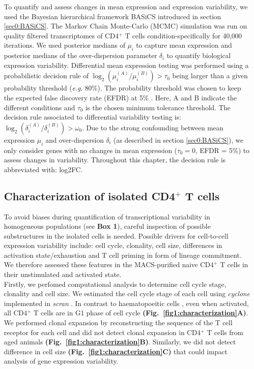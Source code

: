 To quantify and assess changes in mean expression and expression variability, we used the Bayesian hierarchical framework BASiCS introduced in section \ref{sec0:BASiCS}\citep{Vallejos2015BASiCS, Vallejos2016}. The Markov Chain Monte-Carlo (MCMC) simulation was run on quality filtered transcriptomes of CD4$^+$ T cells condition-specifically for 40,000 iterations. We used posterior medians of $\mu_i$ to capture mean expression and posterior medians of the over-dispersion parameter $\delta_i$ to quantify biological expression variability. Differential mean expression testing was performed using a probabilistic decision rule of $\log_2(\mu_i^{(A)}/\mu_i^{(B)})>\tau_0$ being larger than a given probability threshold (\emph{e.g.} 80\%). The probability threshold was chosen to keep the expected false discovery rate (EFDR) at 5\% \citep{Vallejos2016}. Here, A and B indicate the different conditions and $\tau_0$ is the chosen minimum tolerance threshold. The decision rule associated to differential variability testing is: $\log_2(\delta_i^{(A)}/\delta_i^{(B)})>\omega_0$. Due to the strong confounding between mean expression $\mu_i$ and over-dispersion $\delta_i$ (as described in section \ref{sec0:BASiCS}), we only consider genes with no changes in mean expression ($\tau_0=0$, EFDR = 5\%) to assess changes in variability. Throughout this chapter, the decision rule is abbreviated with: log2FC. 

\newpage

\subsection{Characterization of isolated CD4$^+$ T cells}
\label{sec1:characterization}

To avoid biases during quantification of transcriptional variability in homogeneous populations (see \textbf{Box 1}), careful inspection of possible substructures in the isolated cells is needed. Possible drivers for cell-to-cell expression variability include: cell cycle, clonality, cell size, differences in activation state/exhaustion and T cell priming in form of lineage commitment. We therefore assessed these features in the MACS-purified naive CD4$^+$ T cells in their unstimulated and activated state.\\

Firstly, we perfomed computational analysis to determine cell cycle stage, clonality and cell size. We estimated the cell cycle stage of each cell using \emph{cyclone} \citep{Scialdone2015} implemented in \emph{scran} \citep{Lun2016}. In contrast to haematopoeitic cells \citep{Kowalczyk2015}, even when activated, all CD4$^+$ T cells are in G1 phase of cell cycle \textbf{(Fig.~\ref{fig1:characterization}A)}. We performed clonal expansion by reconstructing the sequence of the T cell receptor for each cell \citep{Stubbington2015} and did not detect clonal expansion in CD4$^+$ T cells from aged animals \textbf{(Fig.~\ref{fig1:characterization}B)}. Similarly, we did not detect difference in cell size \textbf{(Fig.~\ref{fig1:characterization}C)} that could impact analysis of gene expression variability. \\

